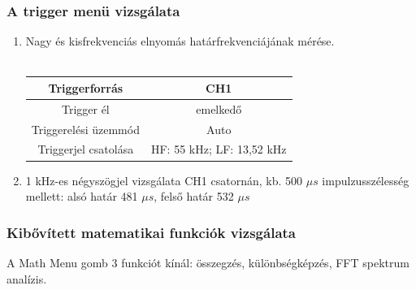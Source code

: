 \documentclass[10pt,a4paper]{article}
\begin{document}
			\subsubsection{A trigger menü vizsgálata}
			\begin{enumerate}
				\item Nagy és kisfrekvenciás elnyomás határfrekvenciájának mérése.\\\\\begin{tabular}{|c|c|}
				\hline 
				Triggerforrás & CH1 \\ 
				\hline 
				Trigger él & emelkedő \\ 
				\hline 
				Triggerelési üzemmód & Auto \\ 
				\hline 
				Triggerjel csatolása & HF: 55 kHz; LF: 13,52 kHz \\ 
				\hline 
				\end{tabular}  
				\item 1 kHz-es négyszögjel vizsgálata CH1 csatornán, kb. 500 $\mu s$ impulzusszélesség mellett: alsó határ 481 $\mu s$, felső határ 532 $\mu s$
			\end{enumerate}
			\subsubsection{Kibővített matematikai funkciók vizsgálata}
			A Math Menu gomb 3 funkciót kínál: összegzés, különbségképzés, FFT spektrum analízis.
\end{document}
